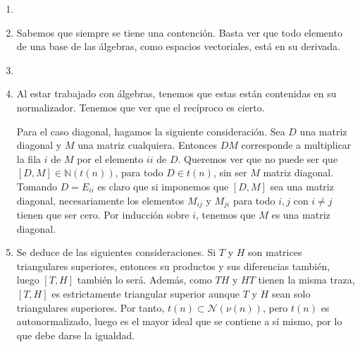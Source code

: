 \documentclass[twoside]{article}
\begin{document}
\begin{solucion}
\begin{enumerate}
\item[]
\item Sabemos que siempre se tiene una contención. Basta ver que todo elemento de una base de las álgebras, como espacios vectoriales, está en su derivada. 

\item 

\item Al estar trabajado con álgebras, tenemos que estas están contenidas en su normalizador. Tenemos que ver que el recíproco es cierto. 
\newpage

Para el caso diagonal, hagamos la siguiente consideración. Sea $D$ una matriz diagonal y $M$ una matriz cualquiera. Entonces $DM$ corresponde a multiplicar la fila $i$ de $M$ por el elemento $ii$ de $D$. Queremos ver que no puede ser que $[D,M] \in \mathbb{N}(t(n))$, para todo $D\in t(n)$, sin ser $M$ matriz diagonal. Tomando $D=E_{ii}$ es claro que si imponemos que $[D,M]$ sea una matriz diagonal, necesariamente los elementos $M_{ij}$ y $M_{ji}$ para todo $i,j$ con $i\neq j$ tienen que ser cero. Por inducción sobre $i$, tenemos que $M$ es una matriz diagonal.
\item Se deduce de las siguientes consideraciones. Si $T$ y $H$ son matrices triangulares superiores, entonces su productos y sus diferencias también, luego $[T,H]$ también lo será. Además, como $TH$ y $HT$ tienen la misma traza, $[T,H]$ es estrictamente triangular superior aunque $T$ y $H$ sean solo triangulares superiores. Por tanto, $t(n) \subset \mathcal{N}(\nu(n))$, pero $t(n)$ es autonormalizado, luego es el mayor ideal que se contiene a sí mismo, por lo que debe darse la igualdad. 
\end{enumerate}
\end{solucion}
\end{document}
